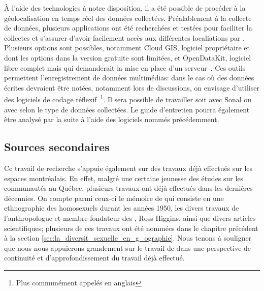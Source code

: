 À l'aide des technologies à notre disposition, il a été possible de procéder à la géolocalisation en temps réel des données collectées. 
Préalablement à la collecte de données, plusieurs applications ont été recherchées et testées pour faciliter la collectes et s'assurer d'avoir facilement accès aux différentes localiations par \gps. 
Plusieurs options sont possibles, notamment Cloud GIS, logiciel propriétaire et dont les options dans la version gratuite sont limitées, et OpenDataKit, logiciel libre complet mais qui demanderait la mise en place d'un serveur~\citep{OpenDataKit2014}. 
Ces outils permettent l'enregistrement de données multimédias: dans le cas où des données écrites devraient être notées, notamment lors de discussions, on envisage d'utiliser des logiciels de codage réflexif~\footnote{Plus communément appelés en anglais   \cadqas}. 
Il sera possible de travailler soit avec Sonal ou avec \rqda{} selon le type de données collectées. 
Le guide d'entretien pourra également être analysé par la suite à l'aide des logiciels nommés précédemment.

\subsection{Sources secondaires}
\label{sub:sources_secondaires}
Ce travail de recherche s'appuie également sur des travaux déjà effectués sur les espaces \qus{} montréalais. 
En effet, malgré une certaine jeunesse des études sur les communautés \lgbt{} au Québec, plusieurs travaux ont déjà effectués dans les dernières décennies. 
On compte parmi ceux-ci le mémoire de \cite{Leznoff1954} qui consiste en une ethnographie des homosexuels durant les années 1950, les divers travaux de l'anthropologue et membre fondateur des \agq{}, Ross Higgins, ainsi que divers articles scientifiques; plusieurs de ces travaux ont été nommées dans le chapitre précédent à la section \ref{sec:la_diversit_sexuelle_en_g_ographie}. 
Nous tenons à souligner que nous nous appuierons grandement sur le travail de \citep{Giraud2014} dans une perspective de continuité et d'approfondissement du travail déjà effectué.

